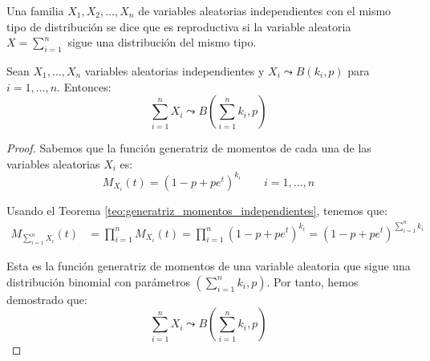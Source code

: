 \begin{definicion}
    Una familia $X_1,X_2,\ldots,X_n$ de variables aleatorias independientes con el mismo tipo de distribución
    se dice que es reproductiva si la variable aleatoria $X=\sum\limits_{i=1}^n$ sigue una distribución del mismo tipo.
\end{definicion}



\begin{prop}
    Sean $X_1, \dots, X_n$ variables aleatorias independientes y $X_i\leadsto B(k_i, p)$ para $i=1,\dots,n$. Entonces:
    \begin{equation*}
        \sum_{i=1}^{n}X_i \leadsto B\left(\sum_{i=1}^{n}k_i, p\right)
    \end{equation*}

    \begin{proof}
        Sabemos que la función generatriz de momentos de cada una de las variables aleatorias $X_i$ es:
        \begin{equation*}
            M_{X_i}(t) = (1-p+pe^t)^{k_i} \qquad i=1,\dots,n
        \end{equation*}

        Usando el Teorema \ref{teo:generatriz_momentos_independientes}, tenemos que:
        \begin{align*}
            M_{\sum\limits_{i=1}^{n}X_i}(t) &= \prod_{i=1}^{n}M_{X_i}(t) = \prod_{i=1}^{n}(1-p+pe^t)^{k_i} = (1-p+pe^t)^{\sum\limits_{i=1}^{n}k_i}
        \end{align*}

        Esta es la función generatriz de momentos de una variable aleatoria que sigue una distribución binomial con parámetros $\left(\sum\limits_{i=1}^{n}k_i, p\right)$. Por tanto, hemos demostrado que:
        \begin{equation*}
            \sum_{i=1}^{n}X_i \leadsto B\left(\sum_{i=1}^{n}k_i, p\right)
        \end{equation*}
    \end{proof}
\end{prop}

